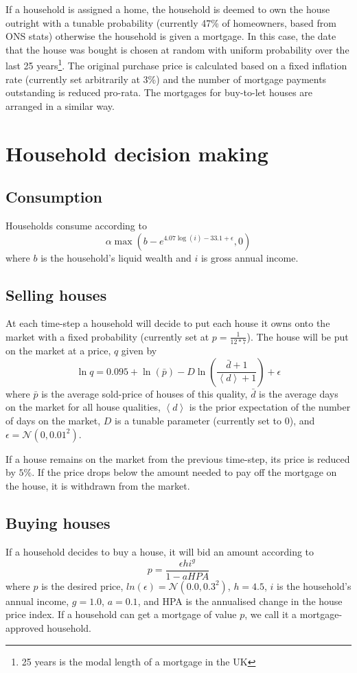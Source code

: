 \documentclass[a4paper]{article}
\begin{document}
If a household is assigned a home, the household is deemed to own the house outright with a tunable probability (currently 47\% of homeowners, based from ONS stats) otherwise the household is given a mortgage. In this case, the date that the house was bought is chosen at random with uniform probability over the last 25 years\footnote{25 years is the modal length of a mortgage in the UK}. The original purchase price is calculated based on a fixed inflation rate (currently set arbitrarily at 3\%) and the number of mortgage payments outstanding is reduced pro-rata. The mortgages for buy-to-let houses are arranged in a similar way.

\section{Household decision making}
\subsection{Consumption}
Households consume according to
\begin{equation}
\alpha \max(b - e^{4.07\log{(i)} - 33.1 + \epsilon},0)
\end{equation}
 where $b$ is the household's liquid wealth and $i$ is gross annual income.

\subsection{Selling houses}
At each time-step a household will decide to put each house it owns onto the market with a fixed probability (currently set at $p = \frac{1}{12*7}$). The house will be put on the market at a price, $q$ given by
\begin{equation}
\ln{q} = 0.095 + \ln{(\bar{p})} - D\ln{\left(\frac{\bar{d}+1}{\left<d\right>+1}\right)} + \epsilon
\end{equation}
where $\bar{p}$ is the average sold-price of houses of this quality, $\bar{d}$ is the average days on the market for all house qualities, $\left<d\right>$ is the prior expectation of the number of days on the market, $D$ is a tunable parameter (currently set to 0), and $\epsilon = \mathcal{N}(0,0.01^2)$.
 
If a house remains on the market from the previous time-step, its price is reduced by $5\%$. If the price drops below the amount needed to pay off the mortgage on the house, it is withdrawn from the market.

\subsection{Buying houses}
If a household decides to buy a house, it will bid an amount according to
\begin{equation}
p = \frac{\epsilon h i^g }{1 - aHPA}
\end{equation}
where $p$ is the desired price, $ln(\epsilon) = \mathcal{N}(0.0,0.3^2)$, $h = 4.5$, $i$ is the household's annual income, $g=1.0$, $a=0.1$, and HPA is the annualised change in the house price index. If a household can get a mortgage of value $p$, we call it a mortgage-approved household.
\end{document}
